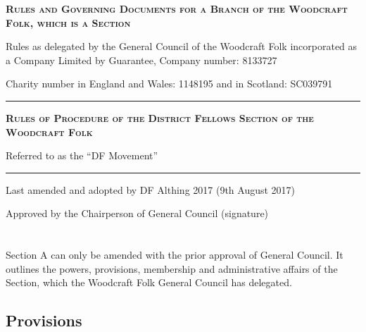 \documentclass[a4paper, 11pt]{report}
\newcommand{\HRule}{\rule{\linewidth}{0.5mm}}
\begin{document}
\begin{titlepage}
\begin{center}

\doublespacing
\vspace*{1cm}

\textsc{\textbf{ \LARGE Rules and Governing Documents for a Branch of the Woodcraft Folk, which is a Section }}

\vspace{1cm}

Rules as delegated by the General Council of the Woodcraft Folk incorporated as a Company Limited by Guarantee, Company number: 8133727

Charity number in England and Wales: 1148195 and in Scotland: SC039791

\vspace{1cm}

\HRule

\vspace{1.5cm}

\textsc{\textbf{\Large Rules of Procedure of the District Fellows Section of the Woodcraft Folk }}

Referred to as the ``DF Movement''

\vspace{1.5cm}

\HRule

\vspace{2cm}

Last amended and adopted by DF Althing 2017 (9th August 2017)

\vspace{0.5cm}

Approved by the Chairperson of General Council (signature) \underline{ \hspace{5cm} }

\end{center}
\end{titlepage}

\tableofcontents

\renewcommand{\chaptername}{Section}
\chapter{}
Section A can only be amended with the prior approval of General Council. It outlines the powers, provisions, membership and administrative affairs of the Section, which the Woodcraft Folk General Council has delegated.

\section{Provisions}
\label{sec:provisions}
\end{document}
